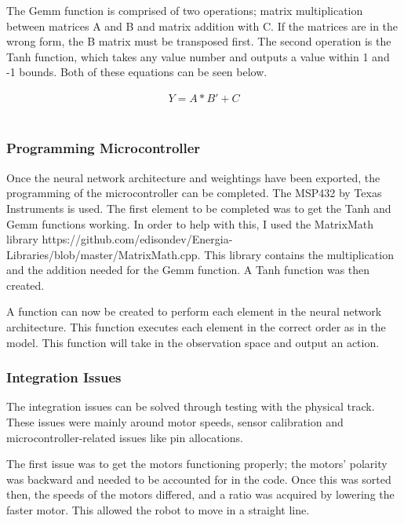 \documentclass[a4paper,11pt]{article}
\begin{document}
The Gemm function is comprised of two operations; matrix multiplication between matrices A and B and matrix addition with C. If the matrices are in the wrong form, the B matrix must be transposed first. The second operation is the Tanh function, which takes any value number and outputs a value within 1 and -1 bounds. Both of these equations can be seen below. 

\begin{equation}
\begin{aligned}
Y = A*B' + C
\end{aligned}
\end{equation}


\begin{equation}
\begin{aligned}
\end{aligned}
\end{equation}



\subsubsection{Programming Microcontroller}
Once the neural network architecture and weightings have been exported, the programming of the microcontroller can be completed. The MSP432 by Texas Instruments is used. The first element to be completed was to get the Tanh and Gemm functions working. In order to help with this, I used the MatrixMath library https://github.com/edisondev/Energia-Libraries/blob/master/MatrixMath.cpp. This library contains the multiplication and the addition needed for the Gemm function. A Tanh function was then created. 

A function can now be created to perform each element in the neural network architecture. This function executes each element in the correct order as in the model. This function will take in the observation space and output an action. 


\subsubsection{Integration Issues}

The integration issues can be solved through testing with the physical track. These issues were mainly around motor speeds, sensor calibration and microcontroller-related issues like pin allocations. 

The first issue was to get the motors functioning properly; the motors' polarity was backward and needed to be accounted for in the code. Once this was sorted then, the speeds of the motors differed, and a ratio was acquired by lowering the faster motor. This allowed the robot to move in a straight line. 
\end{document}
